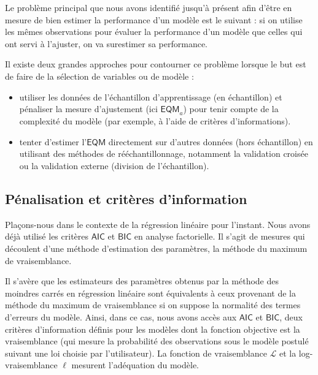\documentclass[
  11pt,
  letterpaper,
]{scrbook}
\providecommand{\tightlist}{%
  \setlength{\itemsep}{0pt}\setlength{\parskip}{0pt}}\usepackage{longtable,booktabs,array}
\theoremstyle{definition}
\theoremstyle{remark}
\begin{document}
Le problème principal que nous avons identifié jusqu'à présent afin
d'être en mesure de bien estimer la performance d'un modèle est le
suivant : si on utilise les mêmes observations pour évaluer la
performance d'un modèle que celles qui ont servi à l'ajuster, on va
surestimer sa performance.

Il existe deux grandes approches pour contourner ce problème lorsque le
but est de faire de la sélection de variables ou de modèle :

\begin{itemize}
\tightlist
\item
  utiliser les données de l'échantillon d'apprentissage (en échantillon)
  et pénaliser la mesure d'ajustement (ici \(\widehat{\mathsf{EQM}}_a\))
  pour tenir compte de la complexité du modèle (par exemple, à l'aide de
  critères d'informations).
\item
  tenter d'estimer l'\(\mathsf{EQM}\) directement sur d'autres données
  (hors échantillon) en utilisant des méthodes de rééchantillonnage,
  notamment la validation croisée ou la validation externe (division de
  l'échantillon).
\end{itemize}

\hypertarget{puxe9nalisation-et-crituxe8res-dinformation}{%
\subsection{Pénalisation et critères
d'information}\label{puxe9nalisation-et-crituxe8res-dinformation}}

Plaçons-nous dans le contexte de la régression linéaire pour l'instant.
Nous avons déjà utilisé les critères \(\mathsf{AIC}\) et
\(\mathsf{BIC}\) en analyse factorielle. Il s'agit de mesures qui
découlent d'une méthode d'estimation des paramètres, la méthode du
maximum de vraisemblance.

Il s'avère que les estimateurs des paramètres obtenus par la méthode des
moindres carrés en régression linéaire sont équivalents à ceux provenant
de la méthode du maximum de vraisemblance si on suppose la normalité des
termes d'erreurs du modèle. Ainsi, dans ce cas, nous avons accès aux
\(\mathsf{AIC}\) et \(\mathsf{BIC}\), deux critères d'information
définis pour les modèles dont la fonction objective est la vraisemblance
(qui mesure la probabilité des observations sous le modèle postulé
suivant une loi choisie par l'utilisateur). La fonction de vraisemblance
\(\mathcal{L}\) et la log-vraisemblance \(\ell\) mesurent l'adéquation
du modèle.
\end{document}
